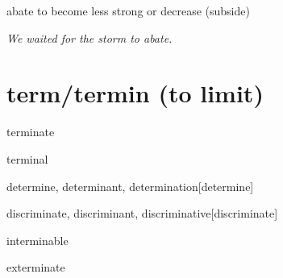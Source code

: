 \begin{DefWord}{abate}
    to become less strong or decrease (subside)

    \textit{We waited for the storm to abate.}
\end{DefWord}

\section{term/termin (to limit)}

\begin{DefWord}{terminate}
\end{DefWord}

\begin{DefWord}{terminal}
\end{DefWord}

\begin{DefWord}{determine, determinant, determination}[determine]
\end{DefWord}

\begin{remark}
    \begin{RefWord}{discriminate, discriminant, discriminative}[discriminate]
\end{RefWord}
\end{remark}


\begin{DefWord}{interminable}
\end{DefWord}

\begin{DefWord}{exterminate}
\end{DefWord}